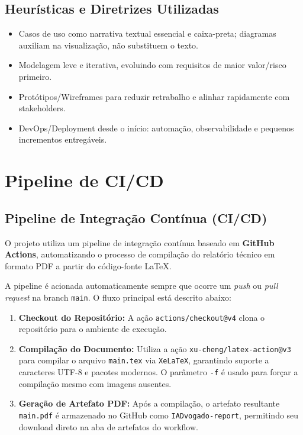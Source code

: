 \documentclass{article}
\begin{document}
\subsection{Heurísticas e Diretrizes Utilizadas}
\begin{itemize}
    \item Casos de uso como narrativa textual essencial e caixa-preta; diagramas auxiliam na visualização, não substituem o texto.
    \item Modelagem leve e iterativa, evoluindo com requisitos de maior valor/risco primeiro.
    \item Protótipos/Wireframes para reduzir retrabalho e alinhar rapidamente com stakeholders.
    \item DevOps/Deployment desde o início: automação, observabilidade e pequenos incrementos entregáveis.
\end{itemize}

\newpage

\section{Pipeline de CI/CD}

\subsection{Pipeline de Integração Contínua (CI/CD)}

O projeto utiliza um pipeline de integração contínua baseado em \textbf{GitHub Actions}, automatizando o processo de compilação do relatório técnico em formato PDF a partir do código-fonte \LaTeX.

A pipeline é acionada automaticamente sempre que ocorre um \textit{push} ou \textit{pull request} na branch \texttt{main}. O fluxo principal está descrito abaixo:

\begin{enumerate}
  \item \textbf{Checkout do Repositório:} A ação \texttt{actions/checkout@v4} clona o repositório para o ambiente de execução.
  \item \textbf{Compilação do Documento:} Utiliza a ação \texttt{xu-cheng/latex-action@v3} para compilar o arquivo \texttt{main.tex} via \texttt{XeLaTeX}, garantindo suporte a caracteres UTF-8 e pacotes modernos. O parâmetro \texttt{-f} é usado para forçar a compilação mesmo com imagens ausentes.
  \item \textbf{Geração de Artefato PDF:} Após a compilação, o artefato resultante \texttt{main.pdf} é armazenado no GitHub como \texttt{IADvogado-report}, permitindo seu download direto na aba de artefatos do workflow.
\end{enumerate}
\end{document}
